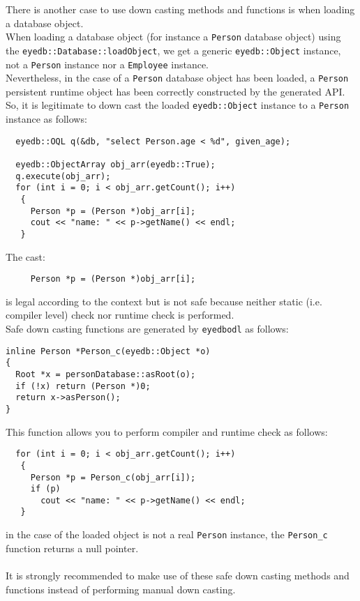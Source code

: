 There is another case to use down casting methods and functions is when
loading a database object.
\\
When loading a database object (for instance a \texttt{Person} database object)
using the \texttt{eyedb::Database::loadObject}, we get a generic \texttt{eyedb::Object}
instance, not a \texttt{Person} instance nor a \texttt{Employee} instance.
\\
Nevertheless, in the case of a \texttt{Person} database object has been
loaded, a \texttt{Person} persistent runtime object has been correctly
constructed by the generated API.
\\
So, it is legitimate to down cast the loaded \texttt{eyedb::Object} instance
to a \texttt{Person} instance as follows:
\verbsize
\begin{verbatim}
  eyedb::OQL q(&db, "select Person.age < %

  eyedb::ObjectArray obj_arr(eyedb::True);
  q.execute(obj_arr);
  for (int i = 0; i < obj_arr.getCount(); i++)
   {
     Person *p = (Person *)obj_arr[i];
     cout << "name: " << p->getName() << endl;
   }
\end{verbatim}
\normalsize
The cast:
\verbsize
\begin{verbatim}
     Person *p = (Person *)obj_arr[i];
\end{verbatim}
\normalsize
is legal according to the context but is not safe because neither static
(i.e. compiler level) check nor runtime check is performed.
\\
Safe down casting functions are generated by \texttt{eyedbodl} as follows:
\verbsize
\begin{verbatim}
inline Person *Person_c(eyedb::Object *o)
{
  Root *x = personDatabase::asRoot(o);
  if (!x) return (Person *)0;
  return x->asPerson();
}
\end{verbatim}
\normalsize
This function allows you to perform compiler and runtime check as follows:
\verbsize
\begin{verbatim}
  for (int i = 0; i < obj_arr.getCount(); i++)
   {
     Person *p = Person_c(obj_arr[i]);
     if (p) 
       cout << "name: " << p->getName() << endl;
   }
\end{verbatim}
\normalsize
in the case of the loaded object is not a real \texttt{Person} instance,
the \texttt{Person\_c} function returns a null pointer.
\\
\\
It is strongly recommended to make use of these safe down casting methods
and functions instead of performing manual down casting.
